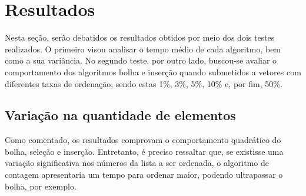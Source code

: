 \section{Resultados}
Nesta seção, serão debatidos os resultados obtidos por meio dos dois testes realizados. O primeiro visou analisar o tempo médio de cada algoritmo, bem como a sua variância. 
No segundo teste, por outro lado, buscou-se avaliar o comportamento dos algoritmos bolha e inserção quando submetidos a vetores com diferentes taxas de ordenação, sendo estas 1\%, 3\%, 5\%, 10\% e, por fim, 50\%. 

\subsection{Variação na quantidade de elementos}
Como comentado, os resultados comprovam o comportamento quadrático do bolha, seleção e inserção. 
Entretanto, é preciso ressaltar que, se existisse uma variação significativa nos números da lista a ser ordenada, o algoritmo de contagem apresentaria um tempo para ordenar maior, podendo ultrapassar o bolha, por exemplo.

